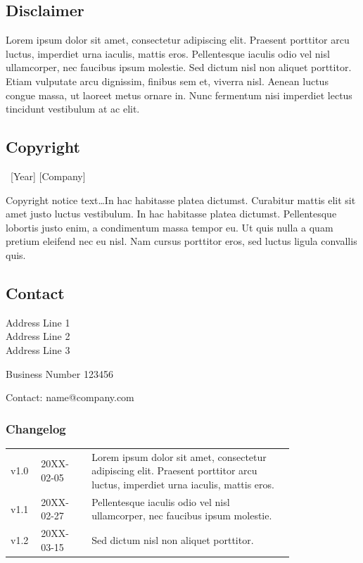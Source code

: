 \documentclass{article}%
\newenvironment{twothirdswidth}{ %
	\begin{adjustwidth}{}{\dimexpr-0.5\marginparwidth-0.5\marginparsep\relax} %
}{
	\end{adjustwidth}
}
\begin{document}
\begin{twothirdswidth} %
	\footnotesize %
	
	\subsection*{Disclaimer}

	Lorem ipsum dolor sit amet, consectetur adipiscing elit. Praesent porttitor arcu luctus, imperdiet urna iaculis, mattis eros. Pellentesque iaculis odio vel nisl ullamcorper, nec faucibus ipsum molestie. Sed dictum nisl non aliquet porttitor. Etiam vulputate arcu dignissim, finibus sem et, viverra nisl. Aenean luctus congue massa, ut laoreet metus ornare in. Nunc fermentum nisi imperdiet lectus tincidunt vestibulum at ac elit.
	
	\subsection*{Copyright}
	
	\textcopyright~[Year] [Company] 
	
	Copyright notice text\ldots In hac habitasse platea dictumst. Curabitur mattis elit sit amet justo luctus vestibulum. In hac habitasse platea dictumst. Pellentesque lobortis justo enim, a condimentum massa tempor eu. Ut quis nulla a quam pretium eleifend nec eu nisl. Nam cursus porttitor eros, sed luctus ligula convallis quis.
	
	\subsection*{Contact}
	
	Address Line 1\\
	Address Line 2\\
	Address Line 3
	
	Business Number 123456
	
	Contact: name@company.com
	
	\vfill %
	
	\subsubsection*{Changelog}
	
	\scriptsize %
	
	\begin{tabular}{@{} L{0.05\linewidth} L{0.15\linewidth} L{0.6\linewidth} @{}} %
		\toprule
		v1.0 & 20XX-02-05 & Lorem ipsum dolor sit amet, consectetur adipiscing elit. Praesent porttitor arcu luctus, imperdiet urna iaculis, mattis eros.\\
		v1.1 & 20XX-02-27 & Pellentesque iaculis odio vel nisl ullamcorper, nec faucibus ipsum molestie.\\
		v1.2 & 20XX-03-15 & Sed dictum nisl non aliquet porttitor.\\
		\bottomrule
	\end{tabular}
\end{twothirdswidth}
\end{document}

